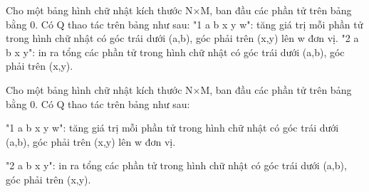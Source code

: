 Cho một bảng hình chữ nhật kích thước N×M, ban đầu các phần tử trên bảng bằng 0. Có Q thao       tác trên bảng như sau:       "1 a b x y w": tăng giá trị mỗi phần tử trong hình chữ nhật có góc trái dưới (a,b), góc phải trên       (x,y) lên w đơn vị.       "2 a b x y": in ra tổng các phần tử trong hình chữ nhật có góc trái dưới (a,b), góc phải trên (x,y).    

   Cho một bảng hình chữ nhật kích thước N×M, ban đầu các phần tử trên bảng bằng 0. Có Q thao tác trên bảng như sau:  

   "1 a b x y w": tăng giá trị mỗi phần tử trong hình chữ nhật có góc trái dưới (a,b), góc phải trên (x,y) lên w đơn vị.  

   "2 a b x y": in ra tổng các phần tử trong hình chữ nhật có góc trái dưới (a,b), góc phải trên (x,y).  



\